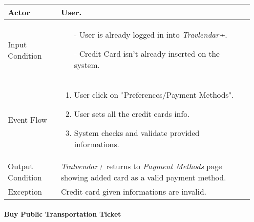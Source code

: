 		\begin{tabular}{| l | p{} | }
			\hline
			\hline
			Actor	&		User. \\
			\hline
			Input Condition		&		\begin{itemize}
													\item[-] User is already logged in into \textit{Travlendar+}.
													\item[-] Credit Card isn't already inserted on the system.
												\end{itemize} \\
			\hline
			Event Flow		&		\begin{enumerate}
												\item User click on "Preferences/Payment Methods".
												\item User sets all the credit cards info.
												\item System checks and validate provided informations.
											\end{enumerate} \\
			\hline
			Output Condition		&		\textit{Tralvendar+} returns to \textit{Payment Methods} page showing added card as a valid payment method. \\
			\hline		
			Exception		&		Credit card given informations are invalid. \\
			\hline
			\hline
		\end{tabular}


	\paragraph{Buy Public Transportation Ticket} \label{buyTicket_useCase}
	
